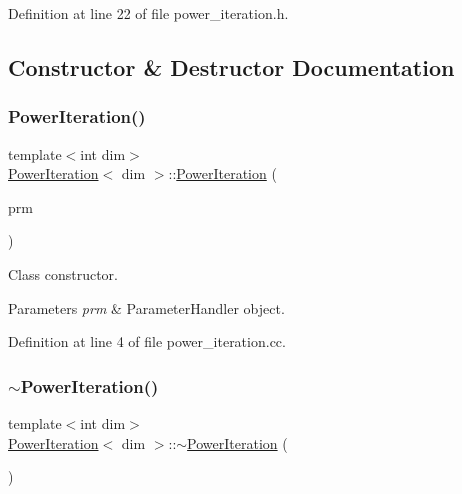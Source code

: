 Definition at line 22 of file power\+\_\+iteration.\+h.



\subsection{Constructor \& Destructor Documentation}
\mbox{\label{class_power_iteration_a2608445223ce7d27b24be0f9d7042554}} 
\subsubsection{\texorpdfstring{Power\+Iteration()}{PowerIteration()}}
{\footnotesize\ttfamily template$<$int dim$>$ \\
\hyperlink{class_power_iteration}{Power\+Iteration}$<$ dim $>$\+::\hyperlink{class_power_iteration}{Power\+Iteration} (\begin{DoxyParamCaption}\item[{const Parameter\+Handler \&}]{prm }\end{DoxyParamCaption})}

Class constructor.


\begin{DoxyParams}{Parameters}
{\em prm} & Parameter\+Handler object. \\
\hline
\end{DoxyParams}


Definition at line 4 of file power\+\_\+iteration.\+cc.

\mbox{\label{class_power_iteration_ad660a351afc4f23b1bcf7b334ef033dd}} 
\subsubsection{\texorpdfstring{$\sim$\+Power\+Iteration()}{~PowerIteration()}}
{\footnotesize\ttfamily template$<$int dim$>$ \\
\hyperlink{class_power_iteration}{Power\+Iteration}$<$ dim $>$\+::$\sim$\hyperlink{class_power_iteration}{Power\+Iteration} (\begin{DoxyParamCaption}{ }\end{DoxyParamCaption})}




